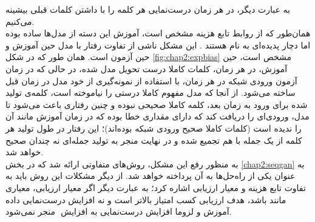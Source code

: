 به عبارت دیگر، در هر زمان درست‌نمایی هر کلمه را با داشتن کلمات قبلی بیشینه می‌کنیم. \\
همان‌طور که از روابط تابع هزینه مشخص است، آموزش این دسته از مدل‌ها ساده بوده اما دچار پدیده‌ای به نام  هستند \cite{ prof_force, s_sampling}. این مشکل ناشی از تفاوت رفتار با مدل حین آموزش و حین آزمون است. همان طور که در شکل \ref{fig:chap2:expbias} مشخص است، حین آموزش، در هر زمان، کلمات کاملا درست تحویل مدل شده، در حالی که در زمان آزمون ورودی شبکه در هر زمان، با استفاده از نمونه‌گیری از خود مدل در زمان قبل ساخته می‌شود. از آنجا که مدل مفهوم کاملا درستی را نیاموخته است، کلمه‌ی تولید شده برای ورود به زمان بعد، کلمه کاملا صحیحی نبوده و چنین رفتاری باعث می‌شود تا مدل، ورودی‌ای را دریافت کند که دارای مقداری خطا بوده که در زمان آموزش مانند آن را ندیده است (کلمات کاملا صحیح ورودی شبکه بوده‌اند)؛ این رفتار در طول تولید هر کلمه از یک جمله با هم تجمیع شده و در نهایت منجر به تولید جمله‌ای نه چندان صحیح خواهد شد.\\
به منظور رفع این مشکل، روش‌های متفاوتی ارائه شد \cite{prof_force, s_sampling, seqgan} که در بخش \ref{chap2:seqgan} به عنوان یکی از راه‌حل‌ها به آن پرداخته خواهد شد.
از دیگر مشکلات این روش باید به تفاوت تابع هزینه و معیار ارزیابی اشاره کرد؛ به عبارت دیگر اگر معیار ارزیابی، معیاری مانند  باشد، هدف ارزیابی کسب امتیاز بالاتر  است و نه افزایش درست‌نمایی داده آموزش و لزوما افزایش درست‌نمایی به افزایش ‌ منجر نمی‌شود.
